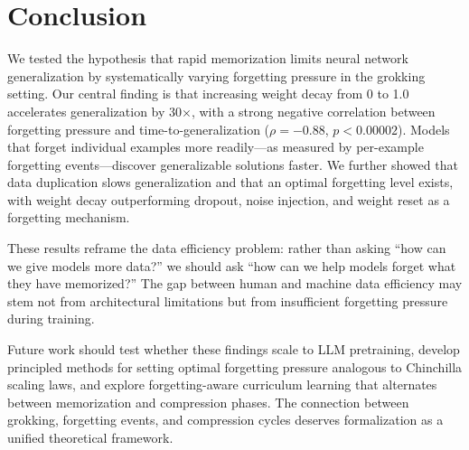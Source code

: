 \section{Conclusion}
\label{sec:conclusion}

We tested the hypothesis that rapid memorization limits neural network generalization by systematically varying forgetting pressure in the grokking setting. Our central finding is that increasing weight decay from 0 to 1.0 accelerates generalization by 30$\times$, with a strong negative correlation between forgetting pressure and time-to-generalization ($\rho = -0.88$, $p < 0.00002$). Models that forget individual examples more readily---as measured by per-example forgetting events---discover generalizable solutions faster. We further showed that data duplication slows generalization and that an optimal forgetting level exists, with weight decay outperforming dropout, noise injection, and weight reset as a forgetting mechanism.

These results reframe the data efficiency problem: rather than asking ``how can we give models more data?'' we should ask ``how can we help models forget what they have memorized?'' The gap between human and machine data efficiency may stem not from architectural limitations but from insufficient forgetting pressure during training.

Future work should test whether these findings scale to LLM pretraining, develop principled methods for setting optimal forgetting pressure analogous to Chinchilla scaling laws, and explore forgetting-aware curriculum learning that alternates between memorization and compression phases. The connection between grokking, forgetting events, and compression cycles deserves formalization as a unified theoretical framework.
